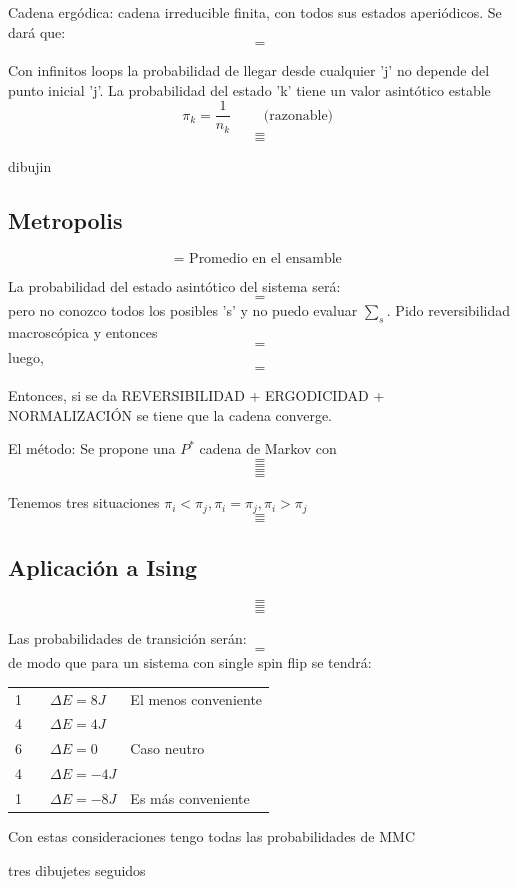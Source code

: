 \documentclass[10pt,oneside]{CBFT_book}
\begin{document}
Cadena ergódica: cadena irreducible finita, con todos sus estados aperiódicos. 
Se dará que:
\[=\]

Con infinitos loops la probabilidad de llegar desde cualquier 'j' no depende del punto inicial 'j'.
La probabilidad del estado 'k' tiene un valor asintótico estable
\[
	\pi_k = \frac{1}{n_k} \qquad \text{ (razonable) } 
\]
\[=\]
\[=\]

dibujin

\subsection{Metropolis}

\[= \text{ Promedio en el ensamble } \]

La probabilidad del estado asintótico del sistema será:
\[=\]
pero no conozco todos los posibles 's' y no puedo evaluar $\sum_s$.
Pido reversibilidad macroscópica y entonces
\[=\]
luego,
\[=\]

Entonces, si se da 
REVERSIBILIDAD + ERGODICIDAD + NORMALIZACIÓN
se tiene que la cadena converge.

El método:
Se propone una $P^*$ cadena de Markov con 
\[=\]
\[=\]
\[=\]
\[=\]

Tenemos tres situaciones $ \pi_i < \pi_j , \pi_i = \pi_j, \pi_i > \pi_j$
\[=\]
\[=\]

\subsection{Aplicación a Ising}

\[=\]
\[=\]
\[=\]

Las probabilidades de transición serán:
\[=\]
de modo que para un sistema con single spin flip se tendrá:
\begin{center}
\begin{tabular}{llll}
1 &  & $ \Delta E = 8J $  & El menos conveniente \\
4 &  & $ \Delta E = 4J $ &  \\
6 &  & $ \Delta E = 0 $ & Caso neutro \\
4 &  & $ \Delta E = -4J $ &  \\
1 &  & $ \Delta E = -8J $ & Es más conveniente
\end{tabular}
\end{center}

Con estas consideraciones tengo todas las probabilidades de MMC

tres dibujetes seguidos

\end{document}
